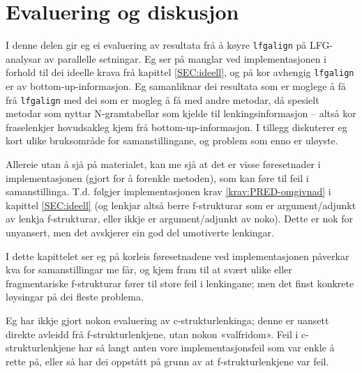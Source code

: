 \documentclass[12pt,a4paper,oneside,draft]{report}
\begin{document}
\chapter{Evaluering og diskusjon}
\label{sec-5}

\label{SEC:diskusjon}


 I denne delen gir eg ei evaluering av resultata frå å køyre
 \texttt{lfgalign} på LFG-analysar av parallelle setningar. Eg ser på manglar
 ved implementasjonen i forhold til dei ideelle krava frå kapittel
 \ref{SEC:ideell}, og på kor avhengig \texttt{lfgalign} er av
 bottom-up-informasjon. Eg samanliknar dei resultata som er moglege å
 få frå \texttt{lfgalign} med dei som er mogleg å få med andre metodar, då
 spesielt metodar som nyttar N-gramtabellar som kjelde til
 lenkingsinformasjon -- altså kor fraselenkjer hovudsakleg kjem frå
 bottom-up-informasjon. I tillegg diskuterer eg kort ulike bruksområde
 for samanstillingane, og problem som enno er uløyste.

 Allereie utan å sjå på materialet, kan me sjå at det er visse
 føresetnader i implementasjonen (gjort for å forenkle metoden), som
 kan føre til feil i samanstillinga. T.d. følgjer implementasjonen
 krav \ref{krav:PRED-omgivnad} i kapittel \ref{SEC:ideell} (og lenkjar
 altså berre f\hyp{}strukturar som er argument/adjunkt av lenkja
 f\hyp{}strukturar, eller ikkje er argument/adjunkt av noko). Dette er nok
 for unyansert, men det avskjerer ein god del umotiverte lenkingar.

 I dette kapittelet ser eg på korleis føresetnadene ved
 implementasjonen påverkar kva for samanstillingar me får, og kjem
 fram til at svært ulike eller fragmentariske f\hyp{}strukturar fører til
 store feil i lenkingane; men det finst konkrete løysingar på dei
 fleste problema. 

 Eg har ikkje gjort nokon evaluering av c\hyp{}strukturlenkinga; denne er
 uansett direkte avleidd frå f\hyp{}strukturlenkjene, utan nokon
 «valfridom». Feil i c\hyp{}strukturlenkjene har så langt anten vore
 implementasjonsfeil som var enkle å rette på, eller så har dei
 oppstått på grunn av at f\hyp{}strukturlenkjene var feil.
 
\end{document}
